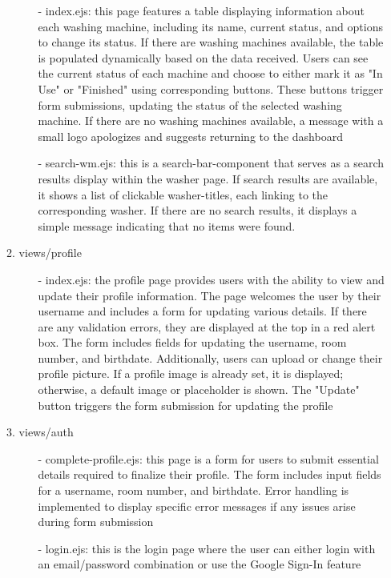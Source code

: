 \documentclass[conference]{IEEEtran}
\begin{document}
\begin{enumerate}
\begin{enumerate}
\begin{itemize}
                    \item[-] index.ejs: this page features a table displaying information about each washing machine, including its name, current status, and options to change its status. If there are washing machines available, the table is populated dynamically based on the data received. Users can see the current status of each machine and choose to either mark it as "In Use" or "Finished" using corresponding buttons. These buttons trigger form submissions, updating the status of the selected washing machine. If there are no washing machines available, a message with a small logo apologizes and suggests returning to the dashboard
                    \item[-] search-wm.ejs: this is a search-bar-component that serves as a search results display within the washer page. If search results are available, it shows a list of clickable washer-titles, each linking to the corresponding washer. If there are no search results, it displays a simple message indicating that no items were found.
                \end{itemize}
            \item views/profile
                \begin{itemize}
                    \item[-] index.ejs: the profile page provides users with the ability to view and update their profile information. The page welcomes the user by their username and includes a form for updating various details. If there are any validation errors, they are displayed at the top in a red alert box. The form includes fields for updating the username, room number, and birthdate. Additionally, users can upload or change their profile picture. If a profile image is already set, it is displayed; otherwise, a default image or placeholder is shown. The "Update" button triggers the form submission for updating the profile
                \end{itemize}
            \item views/auth
                \begin{itemize}
                    \item[-] complete-profile.ejs: this page is a form for users to submit essential details required to finalize their profile. The form includes input fields for a username, room number, and birthdate. Error handling is implemented to display specific error messages if any issues arise during form submission
                    \item[-] login.ejs: this is the login page where the user can either login with an email/password combination or use the Google Sign-In feature

\end{itemize}
\end{enumerate}
\end{enumerate}
\end{document}

